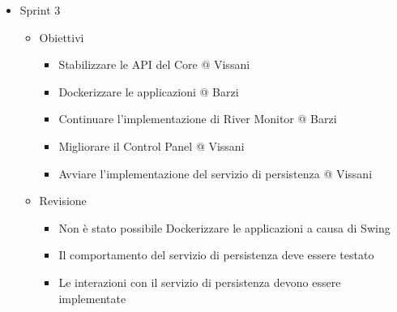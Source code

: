 \documentclass{scrartcl}
\begin{document}
\begin{itemize}
    \item Sprint 3
          \begin{itemize}
              \item Obiettivi
                    \begin{itemize}
                        \item Stabilizzare le API del Core @ Vissani
                        \item Dockerizzare le applicazioni @ Barzi
                        \item Continuare l'implementazione di River Monitor @ Barzi
                        \item Migliorare il Control Panel @ Vissani
                        \item Avviare l'implementazione del servizio di persistenza @ Vissani
                    \end{itemize}
              \item Revisione
                    \begin{itemize}
                        \item Non è stato possibile Dockerizzare le applicazioni a causa di Swing
                        \item Il comportamento del servizio di persistenza deve essere testato
                        \item Le interazioni con il servizio di persistenza devono essere implementate
                    \end{itemize}
          \end{itemize}
\end{itemize}
\end{document}
